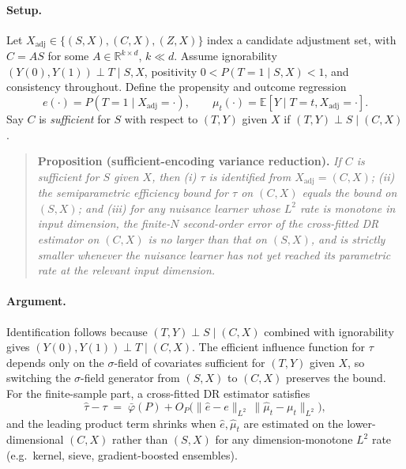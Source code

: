 \documentclass{article}
\begin{document}
\paragraph{Setup.}
Let $X_{\text{adj}}\in\{(S,X),(C,X),(Z,X)\}$ index a candidate adjustment set,
with $C=AS$ for some $A\in\mathbb{R}^{k\times d}$, $k\ll d$. Assume
ignorability $(Y(0),Y(1))\perp T\mid S,X$, positivity
$0<P(T{=}1\mid S,X)<1$, and consistency throughout. Define the propensity and
outcome regression
\[
e(\cdot)=P(T{=}1\mid X_{\text{adj}}{=}\cdot),\qquad
\mu_t(\cdot)=\mathbb{E}[Y\mid T{=}t,X_{\text{adj}}{=}\cdot].
\]
Say $C$ is \emph{sufficient} for $S$ with respect to $(T,Y)$ given $X$ if
$(T,Y)\perp S\mid (C,X)$.

\begin{quote}
\textbf{Proposition (sufficient-encoding variance reduction).}
\emph{If $C$ is sufficient for $S$ given $X$, then (i) $\tau$ is identified
from $X_{\text{adj}}=(C,X)$; (ii) the semiparametric efficiency bound for
$\tau$ on $(C,X)$ equals the bound on $(S,X)$; and (iii) for any
nuisance learner whose $L^2$ rate is monotone in input dimension, the
finite-$N$ second-order error of the cross-fitted DR estimator on $(C,X)$ is
no larger than that on $(S,X)$, and is strictly smaller whenever the
nuisance learner has not yet reached its parametric rate at the relevant
input dimension.}
\end{quote}

\paragraph{Argument.}
Identification follows because $(T,Y)\perp S\mid (C,X)$ combined with
ignorability gives $(Y(0),Y(1))\perp T\mid (C,X)$. The efficient influence
function for $\tau$ depends only on the $\sigma$-field of covariates
sufficient for $(T,Y)$ given $X$,\cite{hahn1998role} so switching the
$\sigma$-field generator from $(S,X)$ to $(C,X)$ preserves the bound. For
the finite-sample part, a cross-fitted DR estimator
satisfies\cite{chernozhukov2018double}
\[
\hat\tau-\tau \;=\;\bar\varphi(P)+O_P\big(\|\hat e-e\|_{L^2}\,\|\hat\mu_t-\mu_t\|_{L^2}\big),
\]
and the leading product term shrinks when $\hat e,\hat\mu_t$ are estimated
on the lower-dimensional $(C,X)$ rather than $(S,X)$ for any
dimension-monotone $L^2$ rate (e.g.\ kernel, sieve, gradient-boosted
ensembles).\cite{ma2012semiparametric,nabi2022causal}
\end{document}
